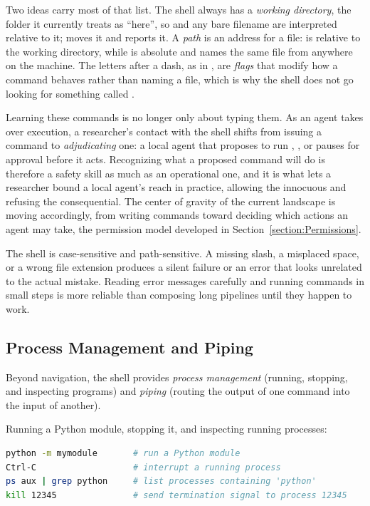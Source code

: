 Two ideas carry most of that list.
The shell always has a \emph{working directory}, the folder it currently treats as ``here'', so  and any bare filename are interpreted relative to it;  moves it and  reports it.
A \emph{path} is an address for a file:  is relative to the working directory, while  is absolute and names the same file from anywhere on the machine.
The letters after a dash, as in , are \emph{flags} that modify how a command behaves rather than naming a file, which is why the shell does not go looking for something called .

Learning these commands is no longer only about typing them.
As an agent takes over execution, a researcher's contact with the shell shifts from issuing a command to \emph{adjudicating} one: a local agent that proposes to run , , or  pauses for approval before it acts.
Recognizing what a proposed command will do is therefore a safety skill as much as an operational one, and it is what lets a researcher bound a local agent's reach in practice, allowing the innocuous and refusing the consequential.
The center of gravity of the current landscape is moving accordingly, from writing commands toward deciding which actions an agent may take, the permission model developed in Section~\ref{section:Permissions}.

\begin{remark}
The shell is case-sensitive and path-sensitive.
A missing slash, a misplaced space, or a wrong file extension produces a silent failure or an error that looks unrelated to the actual mistake.
Reading error messages carefully and running commands in small steps is more reliable than composing long pipelines until they happen to work.
\end{remark}

\subsection{Process Management and Piping}

Beyond navigation, the shell provides \emph{process management} (running, stopping, and inspecting programs) and \emph{piping} (routing the output of one command into the input of another).

\begin{example}
Running a Python module, stopping it, and inspecting running processes:
\begin{lstlisting}[language=bash]
python -m mymodule       # run a Python module
Ctrl-C                   # interrupt a running process
ps aux | grep python     # list processes containing 'python'
kill 12345               # send termination signal to process 12345
\end{lstlisting}
\end{example}


